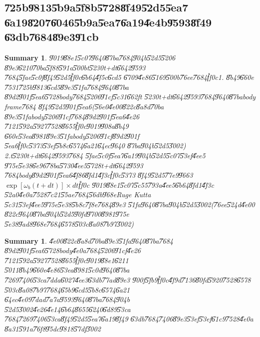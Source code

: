\documentclass[12pt]{article}
\newtheorem{summary}[theorem]{Summary}
\begin{document}
\subsection{\U{725b}\U{9813}\U{5b9a}\U{5f8b}\U{5728}\U{8f49}\U{52d5}\U{5ea7}%
\U{6a19}\U{8207}\U{6046}\U{5b9a}\U{5ea7}\U{6a19}\U{4e4b}\U{9593}\U{8f49}%
\U{63db}\U{7684}\U{89e3}\U{91cb}}

\begin{summary}
\U{9019}\U{88e1}\U{5c07}\U{9640}\U{87ba}\U{7684}\U{904b}\U{52d5}\U{5206}%
\U{89e3}\U{6210}\U{70ba}\U{5f88}\U{591a}\U{500b}t\U{5230}t+dt\U{6642}\U{9593}%
\U{7684}\U{5fae}\U{5c0f}\U{8f49}\U{52d5}\U{ff0c}\U{6b64}\U{4f5c}\U{6cd5}%
\U{6709}\U{4e86}\U{5169}\U{500b}\U{76ee}\U{7684}\U{ff0c}1. \U{8b49}\U{660e}%
\U{7531}\U{725b}\U{9813}\U{6cd5}\U{89e3}\U{51fa}\U{7684}\U{9640}\U{87ba}%
\U{89d2}\U{901f}\U{5ea6}\U{5728}body\U{7684}\U{5206}\U{91cf}\U{5c31}\U{662f}t%
\U{5230}t+dt\U{6642}\U{9593}\U{7684}\U{9640}\U{87ba}body frame\U{7684}%
\U{8f49}\U{52d5}\U{901f}\U{5ea6}(\U{56e0}\U{4e00}\U{822c}\U{8a8d}\U{70ba}%
\U{89e3}\U{51fa}body\U{5206}\U{91cf}\U{7684}\U{89d2}\U{901f}\U{5ea6}\U{4e26}%
\U{7121}\U{592a}\U{5927}\U{7528}\U{8655}\U{ff0c}\U{9019}\U{908a}\U{8b49}%
\U{660e}\U{53ea}\U{8981}\U{89e3}\U{51fa}body\U{5206}\U{91cf}\U{89d2}\U{901f}%
\U{5ea6}\U{ff0c}\U{5373}\U{53ef}\U{5b8c}\U{6574}\U{6a21}\U{64ec}\U{9640}%
\U{87ba}\U{904b}\U{52d5}\U{3002}) 2.t\U{5230}t+dt\U{6642}\U{9593}\U{7684}%
\U{5fae}\U{5c0f}\U{5ea7}\U{6a19}\U{904b}\U{52d5}\U{5c07}\U{53ef}\U{4ee5}%
\U{975e}\U{5e38}\U{6e96}\U{78ba}\U{5730}\U{4ee5}\U{5728}t+dt\U{6642}\U{9593}%
\U{7684}body\U{89d2}\U{901f}\U{5ea6}\U{4f86}\U{8fd1}\U{4f3c}\U{ff0c}\U{5373}%
\U{8f49}\U{52d5}\U{77e9}\U{9663}$\exp [\omega _{b}(t+dt)]\times dt$\U{ff0c}%
\U{9019}\U{88e1}\U{5c07}\U{5c55}\U{793a}\U{4ee5}\U{6b64}\U{8fd1}\U{4f3c}%
\U{52a0}\U{4e0a}\U{7528}\U{7c21}\U{55ae}\U{7684}\U{56db}\U{968e}Ruge Kutta%
\U{5c31}\U{53ef}\U{4ee5}\U{975e}\U{5e38}\U{5b8c}\U{7f8e}\U{7684}\U{89e3}%
\U{51fa}\U{9640}\U{87ba}\U{904b}\U{52d5}\U{3002}(\U{76ee}\U{524d}\U{4e00}%
\U{822c}\U{9640}\U{87ba}\U{904b}\U{52d5}\U{90fd}\U{9700}\U{8981}\U{975e}%
\U{5e38}\U{9ad8}\U{968e}\U{7684}\U{6578}\U{503c}\U{8a08}\U{7b97}\U{3002})
\end{summary}

\begin{summary}
\U{4e00}\U{822c}\U{8a8d}\U{70ba}\U{89e3}\U{51fa}\U{9640}\U{87ba}\U{7684}%
\U{89d2}\U{901f}\U{5ea6}\U{5728}body\U{4e0a}\U{7684}\U{5206}\U{91cf}\U{4e26}%
\U{7121}\U{592a}\U{5927}\U{7528}\U{8655}\U{ff0c}\U{9019}\U{88e1}\U{6211}%
\U{5011}\U{8b49}\U{660e}\U{4e86}\U{53ea}\U{8981}\U{5c0d}\U{9640}\U{87ba}%
\U{7269}\U{7406}\U{53ca}\U{7dda}\U{6027}\U{4ee3}\U{63db}\U{77ad}\U{89e3}%
\U{900f}\U{5fb9}\U{ff0c}\U{4f9d}\U{7136}\U{80fd}\U{5920}\U{7528}\U{6578}%
\U{503c}\U{8a08}\U{7b97}\U{7684}\U{65b9}\U{6cd5}\U{5b8c}\U{6574}\U{6a21}%
\U{64ec}\U{4e09}\U{7dad}\U{7a7a}\U{9593}\U{9640}\U{87ba}\U{7684}\U{904b}%
\U{52d5}\U{3002}\U{4e26}\U{4e14}\U{6b64}\U{8655}\U{6240}\U{6d89}\U{53ca}%
\U{7684}\U{7269}\U{7406}\U{53ca}\U{8f49}\U{52d5}\U{5ea7}\U{6a19}\U{8f49}%
\U{63db}\U{7684}\U{7406}\U{89e3}\U{53ef}\U{53ef}\U{61c9}\U{7528}\U{4e0a}%
\U{8a31}\U{591a}\U{76f8}\U{95dc}\U{9818}\U{57df}\U{3002}
\end{summary}
\end{document}
